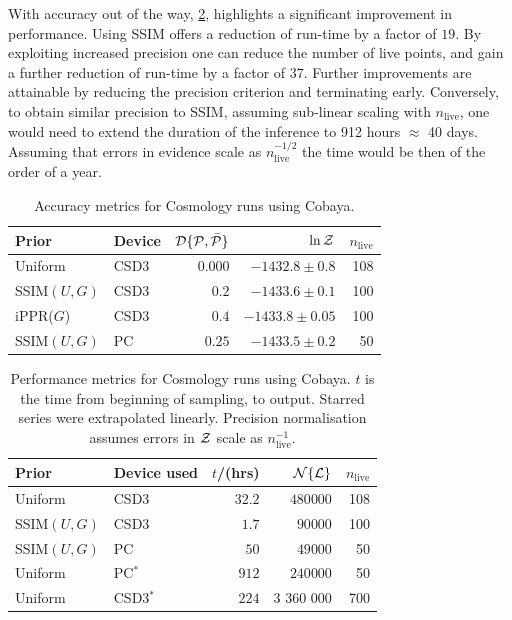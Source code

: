 \documentclass[usenatbib]{mnras}
\begin{document}
With accuracy out of the way, \cref{tab:cosmo-performance}, highlights
a significant improvement in performance. Using SSIM offers a
reduction of run-time by a factor of \(19\). By exploiting increased
precision one can reduce the number of live points, and gain a further
reduction of run-time by a factor of \(37\). Further improvements are
attainable by reducing the precision criterion and terminating
early. Conversely, to obtain similar precision to SSIM, assuming
sub-linear scaling with \(n_\text{live}\), one would need to extend
the duration of the inference to 912 hours \(\approx\) 40
days. Assuming that errors in evidence scale as
\(n_\text{live}^{-1/2}\) the time would be then of the order of a
year.




\begin{table}
  \centering
  \caption{Accuracy metrics for Cosmology runs using Cobaya.}
  \begin{tabular}{llrrr}
    \textbf{Prior} & \textbf{Device} & ${\cal D}\{ {\cal P}, \bar{\cal P}\}$ & $\ln {\cal Z}$ & $n_\text{live}$\\
    \hline
    Uniform & CSD3 &\( 0.000\) & \(-1432.8 \pm 0.8\) & 108\\
    SSIM\((U, G)\) & CSD3 & \(0.2\) & \(-1433.6 \pm 0.1\) & 100\\
    iPPR(\(G\)) & CSD3 & \(0.4\) & \(-1433.8 \pm 0.05\) & 100\\
    SSIM\((U, G)\) & PC & \(0.25\) & \(-1433.5 \pm 0.2\) & 50
  \end{tabular}
  \label{tab:cosmo-accuracy}
\end{table}

\begin{table}
  \centering
  \caption{Performance metrics for Cosmology runs using Cobaya. $t$ is
    the time from beginning of sampling, to output. Starred series
    were extrapolated linearly. Precision normalisation assumes errors in
    ${\cal Z}$ scale as $n_\text{live}^{-1}$. }
  \begin{tabular}{llrrr}
    \textbf{Prior} & \textbf{Device used} & \textbf{$t$/(hrs)} & \({\cal N}\{ {\cal L}\}\) & $n_\text{live}$\\
    \hline
    Uniform & CSD3 &\( 32.2 \) & \(480 000\) & 108\\
    SSIM\((U, G)\) & CSD3 & \(1.7\) & \(90 000\) & 100\\
    SSIM\((U, G)\) & PC & \(50\) & \(49 000\) & 50\\
    \hline
    Uniform & PC$^{*}$ & \(912\) & \(240 000\) & 50\\
    Uniform & CSD3$^{*}$ &  \(224\) & 3 360 000  & 700
  \end{tabular}
  \label{tab:cosmo-performance}
\end{table}
\end{document}
